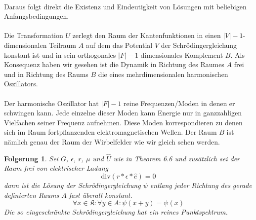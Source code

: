 \documentclass[11pt,a4paper,leqno]{report}
\newtheorem{corollary}[theorem]{Folgerung}
\numberwithin{equation}{chapter}
\begin{document}
\\
Daraus folgt direkt die Existenz und Eindeutigkeit von L\"osungen mit beliebigen Anfangsbedingungen.
\\
\\
Die Transformation $U$ zerlegt den Raum der Kantenfunktionen in einen $|V| - 1$-dimensionalen Teilraum $A$ auf dem das Potential $V$ der Schr\"odingergleichung konstant ist und in sein orthogonales $|F| - 1$-dimensionales Komplement $B$. Als Konsequenz haben wir gesehen ist die Dynamik in Richtung des Raumes $A$ frei und in Richtung des Raums $B$ die eines mehrdimensionalen harmonischen Oszillators.\\
\\
Der harmonische Oszillator hat $|F| - 1$ reine Frequenzen/Moden in denen er schwingen kann. Jede einzelne dieser Moden kann Energie nur in ganzzahligen Vielfachen seiner Frequenz aufnehmen. Diese Moden korrespondieren zu denen sich im Raum fortpflanzenden elektromagnetischen Wellen. Der Raum $B$ ist n\"amlich genau der Raum der Wirbelfelder wie wir gleich sehen werden.
\begin{corollary}
	Sei $G$, $\epsilon$, $r$, $\mu$ und $\hat{U}$ wie in Theorem 6.6 und zus\"atzlich sei der Raum frei von elektrischer Ladung
	\begin{equation}
		\text{div}(r * \epsilon * \hat{e}) = 0
	\end{equation}
	dann ist die L\"osung der Schr\"odingergleichung $\psi$ entlang jeder Richtung des gerade definierten Raums $A$  fast \"uberall konstant.
	\begin{equation}
		\forall x\in \mathfrak{K}:\forall y\in A: \psi(x+y)=\psi(x)
	\end{equation}
	Die so eingeschr\"ankte Schr\"odingergleichung hat ein reines Punktspektrum.
\end{corollary} 
\end{document}
